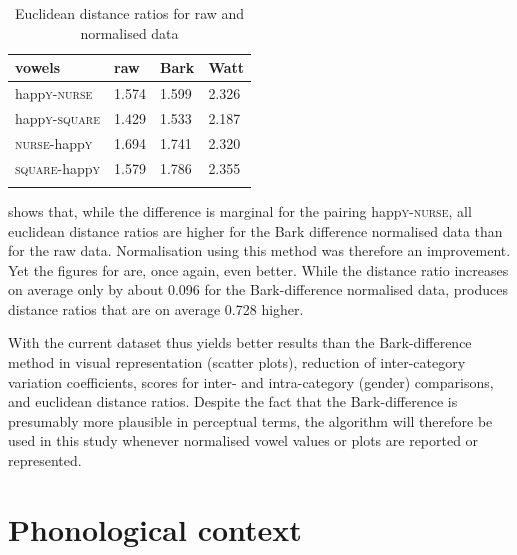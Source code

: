 \begin{table}
	
	\caption{Euclidean distance ratios for raw and normalised data}
	\begin{tabular}{llll}
		\lsptoprule
		vowels & raw & Bark & Watt\\
		\midrule
		happ\textsc{y}-\textsc{nurse} &
		1.574 &
		1.599 &
		2.326 \\
		happ\textsc{y}-\textsc{square} &
		1.429 &
		1.533 &
		2.187 \\
		\textsc{nurse}-happ\textsc{y} &
		1.694 &
		1.741 &
		2.320 \\
		\textsc{square}-happ\textsc{y} &
		1.579 &
		1.786 &
		2.355 \\
		\lspbottomrule
	\end{tabular}
	\label{tab.euclid}
\end{table}

 shows that, while the difference is marginal for the pairing happ\textsc{y}-\textsc{nurse}, all euclidean distance ratios are higher for the Bark difference normalised data than for the raw data.
Normalisation using this method was therefore an improvement.
Yet the figures for \citeauthor{wattfabricius2002} are, once again, even better.
While the distance ratio increases on average only by about 0.096 for the Bark-difference normalised data, \citeauthor{wattfabricius2002} produces distance ratios that are on average 0.728 higher.

With the current dataset \citeauthor{wattfabricius2002} thus yields better results than the Bark-difference method in visual representation (scatter plots), reduction of inter-category variation coefficients,  scores for inter- and intra-category (gender) comparisons, and euclidean distance ratios.
Despite the fact that the Bark-difference  is presumably more plausible in perceptual terms, the \citeauthor{wattfabricius2002} algorithm will therefore be used in this study whenever normalised vowel values or plots are reported or represented.

\section{Phonological context}
\label{sec.prod_method.phon}

